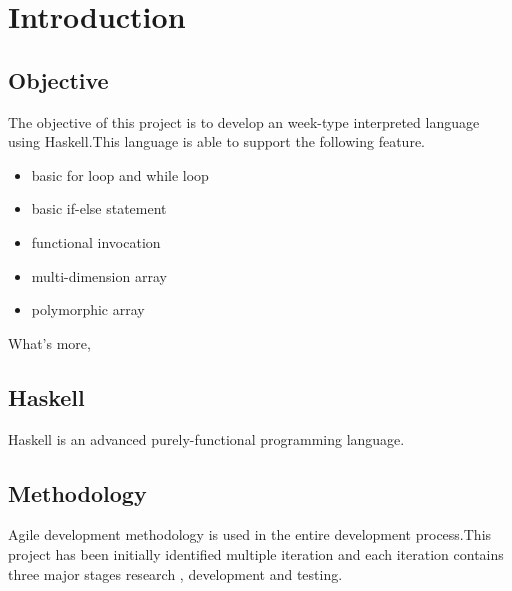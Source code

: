 \chapter{Introduction}
\section{Objective}
The objective of this project is to develop an week-type interpreted language using Haskell.This language is able to support the following feature.
\begin{itemize}
\item basic for loop and while loop
\item basic if-else statement
\item functional invocation 
\item multi-dimension array
\item polymorphic array
\end{itemize}

What's more,

\section{Haskell} 
Haskell is an advanced purely-functional programming language.


\section{Methodology}
Agile development methodology is used in the entire development process.This project has been initially identified multiple iteration and each iteration contains three major stages   research , development and testing.
